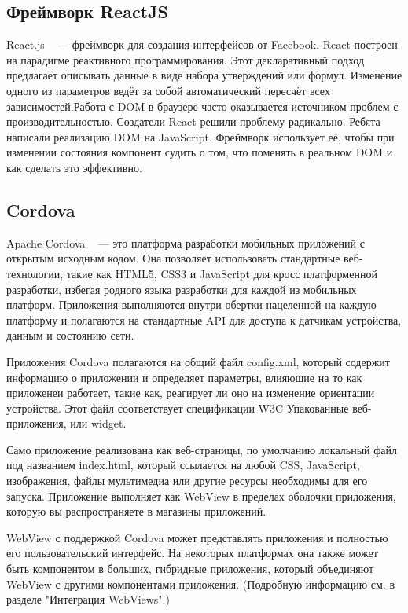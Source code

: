 
\subsection{Фреймворк ReactJS}
\label{sub:domain:other_algos}
React.js ~\cite{react_js} — фреймворк для создания интерфейсов от Facebook. React построен на парадигме реактивного программирования. Этот декларативный подход предлагает описывать данные в виде набора утверждений или формул. Изменение одного из параметров ведёт за собой автоматический пересчёт всех зависимостей.Работа с DOM в браузере часто оказывается источником проблем с производительностью. Создатели React решили проблему радикально. Ребята написали реализацию DOM на JavaScript. Фреймворк использует её, чтобы при изменении состояния компонент судить о том, что поменять в реальном DOM и как сделать это эффективно.

\subsection{Cordova}
\label{sub:domain:other_algos2}
Apache Cordova ~\cite{cordova} — это платформа разработки мобильных приложений с открытым исходным кодом. Она позволяет использовать стандартные веб-технологии, такие как HTML5, CSS3 и JavaScript для кросс платформенной разработки, избегая родного языка разработки для каждой из мобильных платформ. Приложения выполняются внутри обертки нацеленной на каждую платформу и полагаются на стандартные API для доступа к датчикам устройства, данным и состоянию сети.

Приложения Cordova полагаются на общий файл config.xml, который содержит информацию о приложении и определяет параметры, влияющие на то как приложенеи работает, такие как, реагирует ли оно на изменение ориентации устройства. Этот файл соответствует спецификации W3C Упакованные веб-приложения, или widget.

Само приложение реализована как веб-страницы, по умолчанию локальный файл под названием index.html, который ссылается на любой CSS, JavaScript, изображения, файлы мультимедиа или другие ресурсы необходимы для его запуска. Приложение выполняет как WebView в пределах оболочки приложения, которую вы распространяете в магазины приложений.

WebView с поддержкой Cordova может представлять приложения и полностью его пользовательский интерфейс. На некоторых платформах она также может быть компонентом в больших, гибридные приложения, который объединяют WebView с другими компонентами приложения. (Подробную информацию см. в разделе "Интеграция WebViews".)

